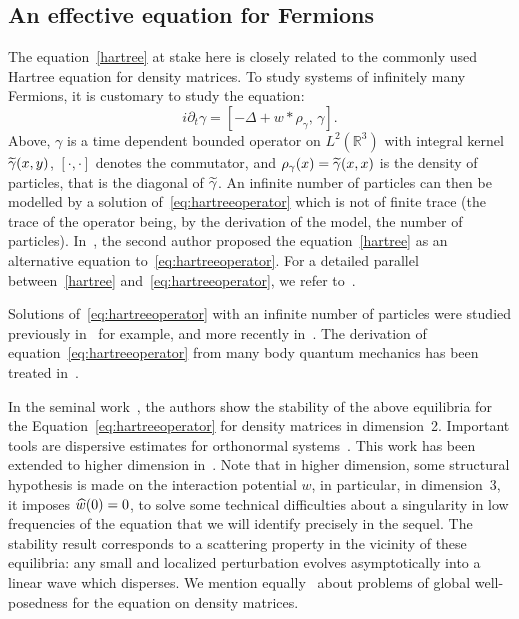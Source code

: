 \documentclass[10pt]{amsart}
\theoremstyle{definition}\newtheorem{defi}[theo]{Definition}\newtheorem{rema}[theo]{Remark}\newtheorem{exam}[theo]{Example}\newtheorem{exem}[theo]{Example}\newtheorem{nota}[theo]{Notation}
\newcommand{\R}{\mathbb{R}}
\newcommand{\pa}{\partial}
\let\oldtilde\tilde
\renewcommand*{\tilde}[1]{\mathchoice{\widetilde{#1}}{\widetilde{#1}}{\oldtilde{#1}}{\oldtilde{#1}}}
\let\oldhat\hat
\renewcommand*{\hat}[1]{\mathchoice{\widehat{#1}}{\widehat{#1}}{\oldhat{#1}}{\oldhat{#1}}}
\begin{document}
\subsection{An effective equation for Fermions}
The equation~\eqref{hartree} at stake here is closely related to the commonly used Hartree equation for density matrices. To study systems of infinitely many Fermions, it is customary to study the equation:
\begin{equation} \label{eq:hartreeoperator} i\pa_t \gamma = [-\Delta +w*\rho_{\gamma},\,\gamma].
\end{equation} 
Above, $\gamma$ is a time dependent bounded operator on $L^2(\R^3)$ with integral kernel $\tilde \gamma (x,y) $, $[\cdot,\cdot]$ denotes the commutator, and $\rho_{\gamma}(x)=\tilde \gamma (x,x)$ is the density of particles, that is the diagonal of $\tilde \gamma$. An infinite number of particles can then be modelled by a solution of~\eqref{eq:hartreeoperator} which is not of finite trace (the trace of the operator being, by the derivation of the model, the number of particles). In~\cite{dS}, the second author proposed the equation~\eqref{hartree} as an alternative equation to~\eqref{eq:hartreeoperator}. For a detailed parallel between~\eqref{hartree} and~\eqref{eq:hartreeoperator}, we refer to~\cite{CodS,dS,CdS2}.

Solutions of~\eqref{eq:hartreeoperator} with an infinite number of particles were studied previously in~\cite{BPF,BPF2,C,Z} for example, and more recently in~\cite{CHP,CHP2,lewsab2,lewsabI}. The derivation of equation~\eqref{eq:hartreeoperator} from many body quantum mechanics has been treated in~\cite{BEGMY,BGGM,BJPSS,derfer3,EESY,derfer5}.

In the seminal work~\cite{lewsab2}, the authors show the stability of the above equilibria for the Equation~\eqref{eq:hartreeoperator} for density matrices in dimension~2. Important tools are dispersive estimates for orthonormal systems~\cite{FLLS,FS}. This work has been extended to higher dimension in~\cite{CHP2}. Note that in higher dimension, some structural hypothesis is made on the interaction potential $w$, in particular, in dimension~$3$, it imposes $\hat w(0) = 0$, to solve some technical difficulties about a singularity in low frequencies of the equation that we will identify precisely in the sequel. The stability result corresponds to a scattering property in the vicinity of these equilibria: any small and localized perturbation evolves asymptotically into a linear wave which disperses. We mention equally~\cite{CHP,lewsabI} about problems of global well-posedness for the equation on density matrices.
\end{document}

